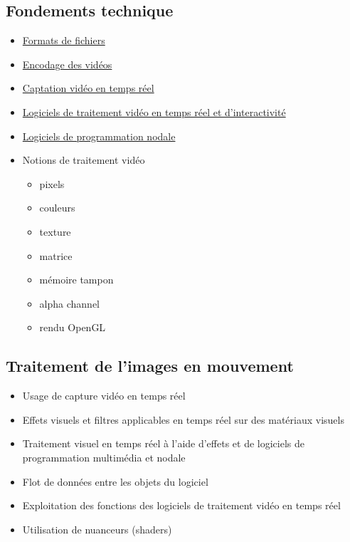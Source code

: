 \documentclass[
]{book}
\providecommand{\tightlist}{%
  \setlength{\itemsep}{0pt}\setlength{\parskip}{0pt}}
\begin{document}
\hypertarget{fondements-technique}{%
\subsection{Fondements technique}\label{fondements-technique}}

\begin{itemize}
\tightlist
\item
  \protect\hyperlink{lexique_fichiers}{Formats de fichiers}
\item
  \protect\hyperlink{lexique_encodage}{Encodage des vidéos}\\
\item
  \protect\hyperlink{aquerir_captation}{Captation vidéo en temps réel}
\item
  \protect\hyperlink{traiter_logiciels}{Logiciels de traitement vidéo en temps réel et d'interactivité}
\item
  \protect\hyperlink{programmer_logiciels}{Logiciels de programmation nodale}
\item
  Notions de traitement vidéo

  \begin{itemize}
  \tightlist
  \item
    pixels
  \item
    couleurs
  \item
    texture
  \item
    matrice
  \item
    mémoire tampon
  \item
    alpha channel
  \item
    rendu OpenGL
  \end{itemize}
\end{itemize}

\hypertarget{traitement-de-limages-en-mouvement}{%
\subsection{Traitement de l'images en mouvement}\label{traitement-de-limages-en-mouvement}}

\begin{itemize}
\tightlist
\item
  Usage de capture vidéo en temps réel\\
\item
  Effets visuels et filtres applicables en temps réel sur des matériaux visuels\\
\item
  Traitement visuel en temps réel à l'aide d'effets et de logiciels de programmation multimédia et nodale
\item
  Flot de données entre les objets du logiciel
\item
  Exploitation des fonctions des logiciels de traitement vidéo en temps réel
\item
  Utilisation de nuanceurs (shaders)
\end{itemize}
\end{document}
